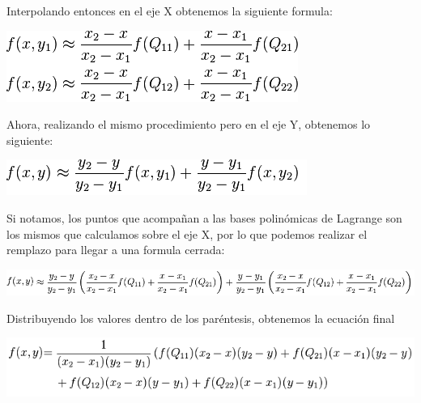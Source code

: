 Interpolando entonces en el eje X obtenemos la siguiente formula:

\begin{center}
\includegraphics[scale=0.75]{imagenes/bilinealX.png}\\
\end{center}


Ahora, realizando el mismo procedimiento pero en el eje Y, obtenemos lo siguiente:

\begin{center}
\includegraphics[scale=0.75]{imagenes/bilinealY.png}\\
\end{center}

Si notamos, los puntos que acompañan a las bases polinómicas de Lagrange son los mismos que calculamos sobre el eje X, por lo que podemos realizar el remplazo para llegar a una formula cerrada:

\begin{center}
\includegraphics[scale=0.75]{imagenes/bilinealXY.png}\\
\end{center}

Distribuyendo los valores dentro de los paréntesis, obtenemos la ecuación final

\begin{center}
\includegraphics[scale=0.75]{imagenes/bilinealFinal.png}\\
\end{center}

